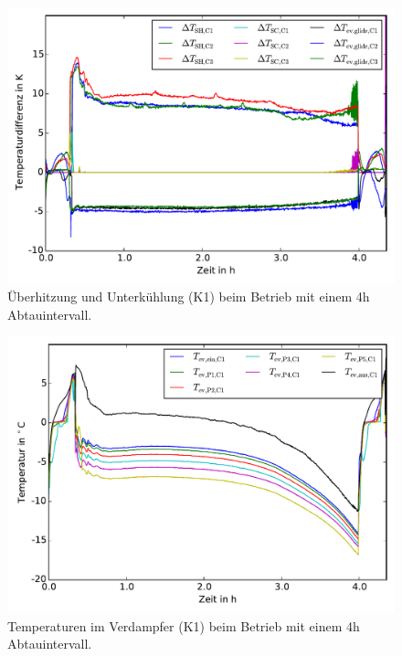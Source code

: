\begin{figure}[h!]
\centering
\includegraphics[scale=0.8]{Pictures/50/deltaTs_lastCycle.pdf}
\caption{Überhitzung und Unterkühlung (K1) beim Betrieb mit einem 4h Abtauintervall.}
\label{fig:deltaT50}
\end{figure}

\begin{figure}[h!]
\centering
\includegraphics[scale=0.8]{Pictures/50/T_evap_C1_lastCycle.pdf}
\caption{Temperaturen im Verdampfer (K1) beim Betrieb mit einem 4h Abtauintervall.}
\label{fig:deltaT50}
\end{figure}

